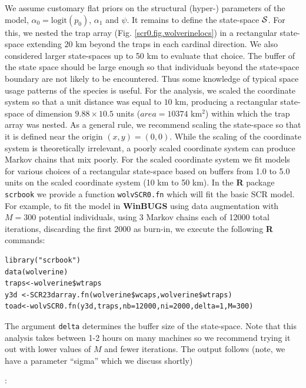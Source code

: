 We assume customary flat priors on the structural (hyper-) parameters
of the model, $\alpha_{0} = \mbox{logit}(p_{0})$, $\alpha_{1}$ and $\psi$.  It remains to define the
state-space ${\cal S}$. For this, we nested the trap array (Fig.
\ref{scr0.fig.wolverinelocs}) in a
 rectangular state-space extending $20$ km beyond the traps in each cardinal
direction.  We also considered larger state-spaces up to 50 km to
evaluate that choice.  The buffer of the state space should be large
enough so that individuals beyond the state-space boundary are not
likely to be encountered. Thus some knowledge of typical space usage
patterns of the species is useful.  For the analysis, 
we scaled the coordinate system 
so that a unit distance was equal to $10$ km, producing a rectangular
state-space of dimension $9.88 \times 10.5$ units ($area = 10374$ km$^2$)
within which the trap array was nested. As a general rule, we
recommend scaling the state-space so that it is defined near the
origin $(x,y)=(0,0)$. While the scaling of the coordinate system is
theoretically irrelevant, a poorly scaled coordinate system can
produce Markov chains that mix poorly.  For the scaled coordinate
system we fit models for various choices of a rectangular state-space
based on 
buffers from 1.0 to 5.0 units on the scaled coordinate system (10 km to
50 km). In the {\bf R} package \mbox{\tt scrbook} we provide a
function
\mbox{\tt wolvSCR0.fn} which will fit the basic SCR model. For
example, to fit the model in 
{\bf WinBUGS} using data augmentation with $M=300$ potential individuals,
using 3 Markov chains each of 12000 total iterations, discarding the
first 2000 as burn-in, we execute the following {\bf R} commands:
{\small
\begin{verbatim}
library("scrbook")
data(wolverine)
traps<-wolverine$wtraps
y3d <-SCR23darray.fn(wolverine$wcaps,wolverine$wtraps)
toad<-wolvSCR0.fn(y3d,traps,nb=12000,ni=2000,delta=1,M=300)
\end{verbatim}
}
The argument \mbox{\tt delta} determines the buffer size of the state-space.
Note that this analysis takes 
between 1-2 hours on many machines so we recommend trying it out with
lower values of $M$ and fewer iterations.
The output
follows (note, we have a parameter ``sigma'' which we discuss
shortly) :


